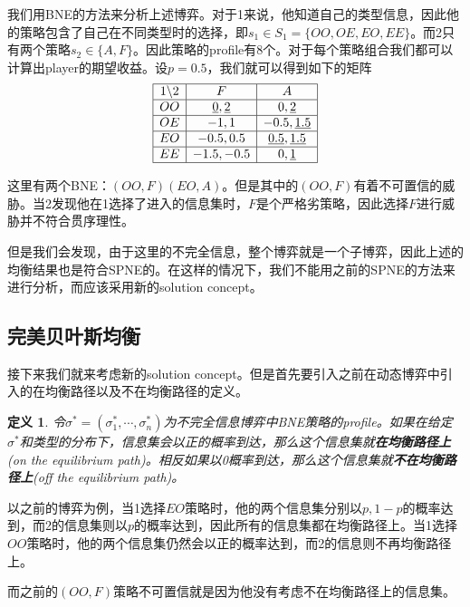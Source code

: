 \documentclass[UTF8,12pt]{ctexart}
\newtheorem{Def}{定义}[section]
\numberwithin{equation}{section} %
\numberwithin{figure}{section}
\numberwithin{table}{section}
\begin{document}
	我们用BNE的方法来分析上述博弈。对于1来说，他知道自己的类型信息，因此他的策略包含了自己在不同类型时的选择，即$s_1 \in S_1  = \{OO,OE,EO,EE\}$。而2只有两个策略$s_2 \in \{A,F\}$。因此策略的profile有8个。对于每个策略组合我们都可以计算出player的期望收益。设$p = 0.5$，我们就可以得到如下的矩阵
	\begin{equation}
		\begin{array}{|c|c|c|}
			\hline
			1 \backslash 2 & F & A \\
			\hline
			OO & \underline{0},\underline{2} & 0,\underline{2} \\
			\hline
			OE & -1,1 & -0.5,\underline{1.5} \\
			\hline
			EO & -0.5,0.5 & \underline{0.5},\underline{1.5} \\
			\hline
			EE & -1.5,-0.5 & 0,\underline{1}\\
			\hline
		\end{array}
	\end{equation}

	这里有两个BNE：$(OO,F)(EO,A)$。但是其中的$(OO,F)$有着不可置信的威胁。当2发现他在1选择了进入的信息集时，$F$是个严格劣策略，因此选择$F$进行威胁并不符合贯序理性。
	
	但是我们会发现，由于这里的不完全信息，整个博弈就是一个子博弈，因此上述的均衡结果也是符合SPNE的。在这样的情况下，我们不能用之前的SPNE的方法来进行分析，而应该采用新的solution concept。
	
	\subsection{完美贝叶斯均衡}
	接下来我们就来考虑新的solution concept。但是首先要引入之前在动态博弈中引入的在均衡路径以及不在均衡路径的定义。
	
	\begin{Def}
		令$\sigma^* = (\sigma^*_1,\cdots,\sigma^*_n)$为不完全信息博弈中BNE策略的profile。如果在给定$\sigma^*$和类型的分布下，信息集会以正的概率到达，那么这个信息集就\textbf{在均衡路径上}(on the equilibrium path)。相反如果以0概率到达，那么这个信息集就\textbf{不在均衡路径上}(off the equilibrium path)。
	\end{Def}
	
	以之前的博弈为例，当1选择$EO$策略时，他的两个信息集分别以$p,1-p$的概率达到，而2的信息集则以$p$的概率达到，因此所有的信息集都在均衡路径上。当1选择$OO$策略时，他的两个信息集仍然会以正的概率达到，而2的信息则不再均衡路径上。
	
	而之前的$(OO,F)$策略不可置信就是因为他没有考虑不在均衡路径上的信息集。
	
\end{document}

